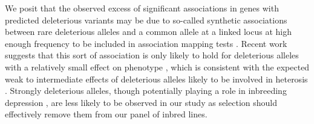 \documentclass[12pt]{article}
\begin{document}
We posit that the observed excess of significant associations in genes with predicted deleterious variants may be due to so-called synthetic associations between rare deleterious alleles and a common allele at a linked locus at high enough frequency to be included in association mapping tests \citep{Dickson2010,Goldstein2009}. Recent work suggests that this sort of association is only likely to hold for deleterious alleles with a relatively small effect on phenotype \citep{Thornton2013}, which is consistent with the expected weak to intermediate effects of deleterious alleles likely to be involved in heterosis \citep{Charlesworth1987,Whitlock2000,Glemin2003,Charlesworth2009}. Strongly deleterious alleles, though potentially playing a role in inbreeding depression \citep{Whitlock2000}, are less likely to be observed in our study as selection should effectively remove them from our panel of inbred lines.  
\end{document}
